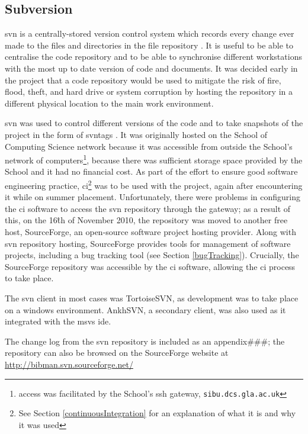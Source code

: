 \documentclass{l4proj}
\newcommand{\revisit}{\#\#\#}
\begin{document}
\subsection{Subversion}
\label{svn}
\gls{svn} is a centrally-stored version control system which records every change ever made to the files and directories in the file repository \cite{CFP04c1}.  It is useful to be able to centralise the code repository and to be able to synchronise different workstations with the most up to date version of code and documents.  It was decided early in the project that a code repository would be used to mitigate the risk of fire, flood, theft, and hard drive or system corruption by hosting the repository in a different physical location to the main work environment.  

\gls{svn} was used to control different versions of the code and to take snapshots of the project in the form of \gls{svntag}s \cite{CFP04c4}.  It was originally hosted on the School of Computing Science network because it was accessible from outside the School's network of computers\footnote{access was facilitated by the School's \gls{ssh} gateway, \texttt{sibu.dcs.gla.ac.uk}}, because there was sufficient storage space provided by the School and it had no financial cost.  As part of the effort to ensure good software engineering practice, \gls{ci}\footnote{See Section \ref{continuousIntegration} for an explanation of what it is and why it was used} was to be used with the project, again after encountering it while on summer placement.  Unfortunately, there were problems in configuring the  \gls{ci}  software to access the \gls{svn} repository through the gateway; as a result of this, on the 16\^{th} of November 2010, the repository was moved to another free host, SourceForge, an open-source software project hosting provider.  Along with \gls{svn} repository hosting, SourceForge provides tools for management of software projects, including a bug tracking tool (see Section \ref{bugTracking}).  Crucially, the SourceForge repository was accessible by the \gls{ci} software, allowing the \gls{ci} process to take place.

The \gls{svn} client in most cases was TortoiseSVN, as development was to take place on a windows environment.  AnkhSVN, a secondary client, was also used as it integrated with the \gls{msvs} \gls{ide}. 

The change log from the \gls{svn} repository is included as an appendix\revisit; the repository can also be browsed on the SourceForge website at \url{http://bibman.svn.sourceforge.net/}
\end{document}
